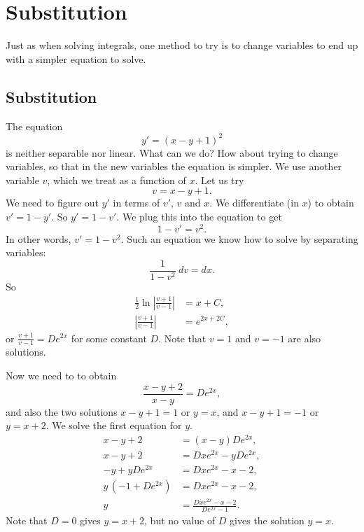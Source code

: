 \documentclass[12pt]{book}
\begin{document}

\sectionnewpage
\section{Substitution}


Just as when solving integrals, one method to try is to change variables to
end up with a simpler equation to solve.

\subsection{Substitution}

The equation
\begin{equation*}
y' = {(x-y+1)}^2 
\end{equation*}
is neither separable nor linear.  What can we do?
How about trying to change variables, so that in the new variables the
equation is simpler.  We use another variable $v$, which we treat as
a function of $x$.  Let us try
\begin{equation*}
v = x-y+1 .
\end{equation*}
We need to figure out
$y'$ in terms of $v'$, $v$ and $x$.  We differentiate (in $x$) to
obtain $v' = 1 - y'$.  So $y' = 1-v'$.  We plug this into the equation to get
\begin{equation*}
1-v' = v^2 .
\end{equation*}
In other words, $v' = 1-v^2$.  Such an equation we know how to solve by
separating variables:
\begin{equation*}
\frac{1}{1-v^2} ~dv = dx .
\end{equation*}
So
\begin{align*}
\frac{1}{2} \ln \left\lvert  \frac{v+1}{v-1} \right\rvert & = x + C , \\
\left\lvert \frac{v+1}{v-1} \right\rvert & = e^{2x + 2C} ,
\end{align*}
or
$\frac{v+1}{v-1} = D e^{2x}$ for some constant $D$.
Note that $v=1$ and $v=-1$ are also solutions.

Now we need to  to obtain
\begin{equation*}
\frac{x-y+2}{x-y} = D e^{2x} ,
\end{equation*}
and also the two solutions $x-y+1=1$ or $y=x$, and $x-y+1=-1$ or $y=x+2$.
We solve the first equation for $y$.
\begin{align*}
x-y+2 &= (x-y)D e^{2x} , \\
x-y+2 &= Dx e^{2x}-yD e^{2x} , \\
-y + yD e^{2x} &= Dx e^{2x} - x - 2 , \\
y\,(-1+ D e^{2x}) &= Dx e^{2x} - x - 2 , \\
y  &= \frac{Dx e^{2x} - x - 2}{D e^{2x}-1} .
\end{align*}
Note that $D=0$ gives $y=x+2$, but no value of $D$ gives the solution $y=x$.
\end{document}
